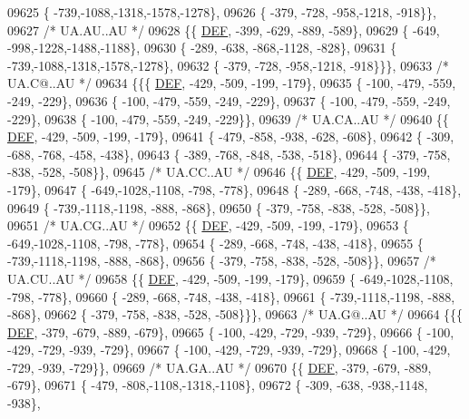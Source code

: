 \begin{DoxyCode}
09625 \{ -739,-1088,-1318,-1578,-1278\},
09626 \{ -379, -728, -958,-1218, -918\}\},
09627 \textcolor{comment}{/* UA.AU..AU */}
09628 \{\{  \mbox{\hyperlink{1_88_84__epars_8h_a397419fc12b37ed479c8abb9d444d843}{DEF}}, -399, -629, -889, -589\},
09629 \{ -649, -998,-1228,-1488,-1188\},
09630 \{ -289, -638, -868,-1128, -828\},
09631 \{ -739,-1088,-1318,-1578,-1278\},
09632 \{ -379, -728, -958,-1218, -918\}\}\},
09633 \textcolor{comment}{/* UA.C@..AU */}
09634 \{\{\{  \mbox{\hyperlink{1_88_84__epars_8h_a397419fc12b37ed479c8abb9d444d843}{DEF}}, -429, -509, -199, -179\},
09635 \{ -100, -479, -559, -249, -229\},
09636 \{ -100, -479, -559, -249, -229\},
09637 \{ -100, -479, -559, -249, -229\},
09638 \{ -100, -479, -559, -249, -229\}\},
09639 \textcolor{comment}{/* UA.CA..AU */}
09640 \{\{  \mbox{\hyperlink{1_88_84__epars_8h_a397419fc12b37ed479c8abb9d444d843}{DEF}}, -429, -509, -199, -179\},
09641 \{ -479, -858, -938, -628, -608\},
09642 \{ -309, -688, -768, -458, -438\},
09643 \{ -389, -768, -848, -538, -518\},
09644 \{ -379, -758, -838, -528, -508\}\},
09645 \textcolor{comment}{/* UA.CC..AU */}
09646 \{\{  \mbox{\hyperlink{1_88_84__epars_8h_a397419fc12b37ed479c8abb9d444d843}{DEF}}, -429, -509, -199, -179\},
09647 \{ -649,-1028,-1108, -798, -778\},
09648 \{ -289, -668, -748, -438, -418\},
09649 \{ -739,-1118,-1198, -888, -868\},
09650 \{ -379, -758, -838, -528, -508\}\},
09651 \textcolor{comment}{/* UA.CG..AU */}
09652 \{\{  \mbox{\hyperlink{1_88_84__epars_8h_a397419fc12b37ed479c8abb9d444d843}{DEF}}, -429, -509, -199, -179\},
09653 \{ -649,-1028,-1108, -798, -778\},
09654 \{ -289, -668, -748, -438, -418\},
09655 \{ -739,-1118,-1198, -888, -868\},
09656 \{ -379, -758, -838, -528, -508\}\},
09657 \textcolor{comment}{/* UA.CU..AU */}
09658 \{\{  \mbox{\hyperlink{1_88_84__epars_8h_a397419fc12b37ed479c8abb9d444d843}{DEF}}, -429, -509, -199, -179\},
09659 \{ -649,-1028,-1108, -798, -778\},
09660 \{ -289, -668, -748, -438, -418\},
09661 \{ -739,-1118,-1198, -888, -868\},
09662 \{ -379, -758, -838, -528, -508\}\}\},
09663 \textcolor{comment}{/* UA.G@..AU */}
09664 \{\{\{  \mbox{\hyperlink{1_88_84__epars_8h_a397419fc12b37ed479c8abb9d444d843}{DEF}}, -379, -679, -889, -679\},
09665 \{ -100, -429, -729, -939, -729\},
09666 \{ -100, -429, -729, -939, -729\},
09667 \{ -100, -429, -729, -939, -729\},
09668 \{ -100, -429, -729, -939, -729\}\},
09669 \textcolor{comment}{/* UA.GA..AU */}
09670 \{\{  \mbox{\hyperlink{1_88_84__epars_8h_a397419fc12b37ed479c8abb9d444d843}{DEF}}, -379, -679, -889, -679\},
09671 \{ -479, -808,-1108,-1318,-1108\},
09672 \{ -309, -638, -938,-1148, -938\},

\end{DoxyCode}
